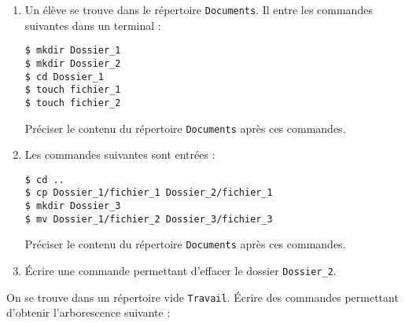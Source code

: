 \documentclass[a4paper,dvipsnames]{article}
\begin{document}
\begin{exercice}{}{}
  \begin{enumerate}
    \item Un élève se trouve dans le répertoire \texttt{Documents}. Il entre les commandes suivantes dans un terminal :

      \begin{verbatim}
$ mkdir Dossier_1
$ mkdir Dossier_2
$ cd Dossier_1
$ touch fichier_1
$ touch fichier_2
      \end{verbatim}

      Préciser le contenu du répertoire \texttt{Documents} après ces commandes.
    \item Les commandes suivantes sont entrées :

      \begin{verbatim}
$ cd ..
$ cp Dossier_1/fichier_1 Dossier_2/fichier_1
$ mkdir Dossier_3
$ mv Dossier_1/fichier_2 Dossier_3/fichier_3
      \end{verbatim}

      Préciser le contenu du répertoire \texttt{Documents} après ces commandes.
    \item Écrire une commande permettant d'effacer le dossier \texttt{Dossier_2}.
  \end{enumerate}
\end{exercice}

\smallskip

\begin{exercice}{}{}
  On se trouve dans un répertoire vide \texttt{Travail}. Écrire des commandes permettant d'obtenir l'arborescence suivante :
  
  \bigskip


\end{exercice}
\end{document}
